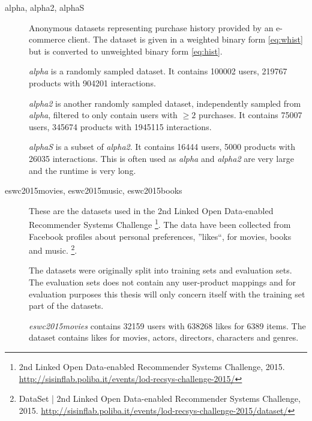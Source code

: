 \begin{description}
    \item[alpha, alpha2, alphaS] \hfill

        Anonymous datasets representing purchase history provided by an e-commerce client. The dataset is given in a weighted binary form \eqref{eq:whist} but is converted to unweighted binary form \eqref{eq:hist}.

        \textit{alpha} is a randomly sampled dataset. It contains 100002 users, 219767 products with 904201 interactions.

        \textit{alpha2} is another randomly sampled dataset, independently sampled from \textit{alpha}, filtered to only contain users with $\geq 2$ purchases. It contains 75007 users, 345674 products with 1945115 interactions.

        \textit{alphaS} is a subset of \textit{alpha2}. It contains 16444 users, 5000 products with 26035 interactions. This is often used as \textit{alpha} and \textit{alpha2} are very large and the runtime is very long.




    \item[eswc2015movies, eswc2015music, eswc2015books] \hfill

        These are the datasets used in the 2nd Linked Open Data-enabled Recommender Systems Challenge
        \footnote{2nd Linked Open Data-enabled Recommender Systems Challenge, 2015. \url{http://sisinflab.poliba.it/events/lod-recsys-challenge-2015/}}.
        The data have been collected from Facebook profiles about personal preferences, ''likes``, for movies, books and music.
        \footnote{DataSet | 2nd Linked Open Data-enabled Recommender Systems Challenge, 2015. \url{http://sisinflab.poliba.it/events/lod-recsys-challenge-2015/dataset/}}.

        The datasets were originally split into training sets and evaluation sets. The evaluation sets does not contain any user-product mappings and for evaluation purposes this thesis will only concern itself with the training set part of the datasets.

        \textit{eswc2015movies} contains 32159 users with 638268 likes for 6389 items. The dataset contains likes for movies, actors, directors, characters and genres.


\end{description}
